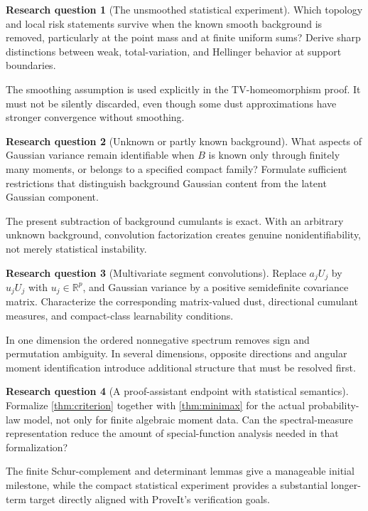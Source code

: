 \documentclass[11pt,letterpaper]{article}
\numberwithin{equation}{section}
\theoremstyle{definition}
\newtheorem{question}{Research question}
\theoremstyle{remark}
\newcommand{\R}{\mathbb R}
\begin{document}
\begin{question}[The unsmoothed statistical experiment]
Which topology and local risk statements survive when the known smooth
background is removed, particularly at the point mass and at finite uniform
sums? Derive sharp distinctions between weak, total-variation, and Hellinger
behavior at support boundaries.
\end{question}
The smoothing assumption is used explicitly in the TV-homeomorphism proof.
It must not be silently discarded, even though some dust approximations
have stronger convergence without smoothing.

\begin{question}[Unknown or partly known background]
What aspects of Gaussian variance remain identifiable when $B$ is known only
through finitely many moments, or belongs to a specified compact family?
Formulate sufficient restrictions that distinguish background Gaussian
content from the latent Gaussian component.
\end{question}
The present subtraction of background cumulants is exact. With an arbitrary
unknown background, convolution factorization creates genuine nonidentifiability,
not merely statistical instability.

\begin{question}[Multivariate segment convolutions]
Replace $a_jU_j$ by $u_jU_j$ with $u_j\in\R^p$, and Gaussian variance by a
positive semidefinite covariance matrix. Characterize the corresponding
matrix-valued dust, directional cumulant measures, and compact-class
learnability conditions.
\end{question}
In one dimension the ordered nonnegative spectrum removes sign and permutation
ambiguity. In several dimensions, opposite directions and angular moment
identification introduce additional structure that must be resolved first.

\begin{question}[A proof-assistant endpoint with statistical semantics]
Formalize \cref{thm:criterion} together with \cref{thm:minimax} for the actual
probability-law model, not only for finite algebraic moment data. Can the
spectral-measure representation reduce the amount of special-function
analysis needed in that formalization?
\end{question}
The finite Schur-complement and determinant lemmas give a manageable initial
milestone, while the compact statistical experiment provides a substantial
longer-term target directly aligned with ProveIt's verification goals.
\end{document}
